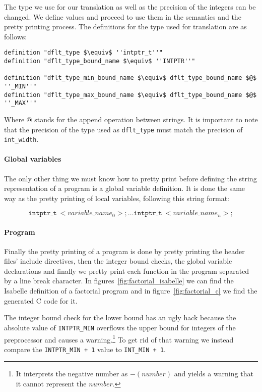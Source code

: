 The type we use for our translation as well as the precision of the integers can be changed.
We define values and proceed to use them in the semantics and the pretty printing process.
The definitions for the type used for translation are as follows:

\begin{lstlisting}[frame=single, mathescape=true]
definition "dflt_type $\equiv$ ''intptr_t''"
definition "dflt_type_bound_name $\equiv$ ''INTPTR''"

definition "dflt_type_min_bound_name $\equiv$ dflt_type_bound_name $@$ ''_MIN''"
definition "dflt_type_max_bound_name $\equiv$ dflt_type_bound_name $@$ ''_MAX''"
\end{lstlisting}

Where $@$ stands for the append operation between strings.
It is important to note that the precision of the type used as \verb|dflt_type| must match the precision of \verb|int_width|.

\paragraph{Global variables}

The only other thing we must know how to pretty print before defining the string representation of a program is a global variable definition.
It is done the same way as the pretty printing of local variables, following this string format:

\begin{equation*}
\mathtt{intptr\_t}\ <variable\_name_0>;
\dots
\mathtt{intptr\_t}\ <variable\_name_n>;
\end{equation*}

\paragraph{Program}

Finally the pretty printing of a program is done by pretty printing the header files' include directives, then the integer bound checks, the global variable declarations and finally we pretty print each function in the program separated by a line break character.
In figures~\ref{fig:factorial_isabelle} we can find the Isabelle definition of a factorial program and in figure~\ref{fig:factorial_c} we find the generated C code for it.

The integer bound check for the lower bound has an ugly hack because the absolute value of \verb|INTPTR_MIN| overflows the upper bound for integers of the preprocessor and causes a warning.\footnote{It interprets the negative number as $-(number)$ and yields a warning that it cannot represent the $number$.}
To get rid of that warning we instead compare the \verb|INTPTR_MIN + 1| value to \verb|INT_MIN + 1|.


